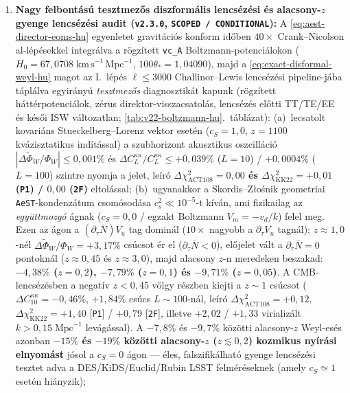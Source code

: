 \documentclass[11pt,a4paper]{article}
\begin{document}
\begin{enumerate}
    \item \textbf{Nagy felbontású tesztmezős diszformális lencsézési és alacsony-$z$ gyenge lencsézési audit (\texttt{v2.3.0}, \texttt{SCOPED / CONDITIONAL}):}
    A \eqref{eq:aest-director-eoms-hu} egyenletet gravitációs konform időben $40\times$ Crank--Nicolson al-lépésekkel integrálva a rögzített \texttt{vc\_A} Boltzmann-potenciálokon ($H_0 = 67{,}0708\;\mathrm{km\,s^{-1}\,Mpc^{-1}}$, $100\theta_* = 1{,}04090$), majd a \eqref{eq:exact-disformal-weyl-hu} magot az I.~lépés $\ell \le 3000$ Challinor--Lewis lencsézési pipeline-jába táplálva egyirányú \emph{tesztmezős} diagnosztikát kapunk (rögzített háttérpotenciálok, zérus direktor-visszacsatolás, lencsézés előtti TT/TE/EE és késői ISW változatlan; \ref{tab:v22-boltzmann-hu}.~táblázat):
    (a)~lecsatolt kovariáns Stueckelberg--Lorenz vektor esetén ($c_S = 1{,}0$, $z=1100$ kvázisztatikus indítással) a szubhorizont akusztikus oszcilláció $|\Delta\tilde{\Phi}_W/\Phi_W| \le 0{,}001\%$ és $\Delta C_L^{\kappa\kappa}/C_L^{\kappa\kappa} \le +0{,}039\%$ ($L=10$) / $+0{,}0004\%$ ($L=100$) szintre nyomja a jelet, leíró \textbf{$\Delta\chi^2_{\mathrm{ACT108}} = 0{,}00$ és $\Delta\chi^2_{\mathrm{KK22}} = +0{,}01$ (\texttt{P1}) / $0{,}00$ (\texttt{2F})} eltolással;
    (b)~ugyanakkor a Skordis--Z{\l}o\'snik geometriai \texttt{AeST}-kondenzátum csomósodása $c_s^2 \ll 10^{-5}$-t kíván, ami fizikailag az \emph{együttmozgó} ágnak ($c_S = 0{,}0$ / egzakt Boltzmann $V_m = -v_d/k$) felel meg. Ezen az ágon a $(\partial_\tau\bar{N}) V_u$ tag dominál ($10\times$ nagyobb a $\partial_\tau V_u$ tagnál): $z \approx 1{,}0$-nél $\Delta\tilde{\Phi}_W/\Phi_W = +3{,}17\%$ csúcsot ér el ($\partial_\tau\bar{N} < 0$), előjelet vált a $\partial_\tau\bar{N} = 0$ pontoknál ($z \approx 0{,}45$ és $z \approx 3{,}0$), majd alacsony $z$-n meredeken beszakad: \textbf{$-4{,}38\%$ ($z=0{,}2$), $-7{,}79\%$ ($z=0{,}1$) és $-9{,}71\%$ ($z=0{,}05$)}. A CMB-lencsézésben a negatív $z < 0{,}45$ völgy részben kiejti a $z \sim 1$ csúcsot ($\Delta C_{10}^{\kappa\kappa} = -0{,}46\%$, $+1{,}84\%$ csúcs $L \sim 100$-nál, leíró $\Delta\chi^2_{\mathrm{ACT108}} = +0{,}12$, $\Delta\chi^2_{\mathrm{KK22}} = +1{,}40$ [\texttt{P1}] / $+0{,}79$ [\texttt{2F}], illetve $+2{,}02$ / $+1{,}33$ virializált $k > 0{,}15\;\mathrm{Mpc}^{-1}$ levágással). A $-7{,}8\%$ és $-9{,}7\%$ közötti alacsony-$z$ Weyl-esés azonban \textbf{$-15\%$ és $-19\%$ közötti alacsony-$z$ ($z \lesssim 0{,}2$) kozmikus nyírási elnyomást} jósol a $c_S = 0$ ágon --- éles, falszifikálható gyenge lencsézési tesztet adva a DES/KiDS/Euclid/Rubin LSST felméréseknek (amely $c_S \simeq 1$ esetén hiányzik);

\end{enumerate}
\end{document}
